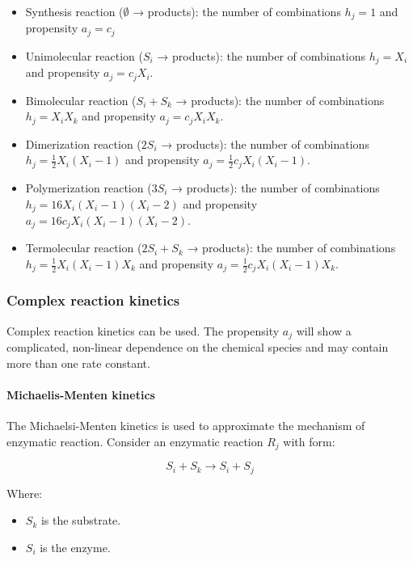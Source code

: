     \begin{itemize}
      \item Synthesis reaction ($\emptyset$ → products): the number of combinations $ h_j = 1 $ and propensity $ a_j =c_j $
      \item Unimolecular reaction ($ S_i$ → products): the number of combinations $h_j= X_i$ and propensity $ a_j = c_jX_i $.
      \item Bimolecular reaction ($ S_i + S_k$ → products): the number of combinations $ h_j = X_iX_k$ and propensity $ a_j = c_jX_iX_k $.
      \item Dimerization reaction ($2S_i$ → products): the number of combinations $ h_j = \frac{1}{2}X_i(X_i -1) $ and propensity $ a_j = \frac{1}{2}c_jX_i(X_i -1) $.
      \item Polymerization reaction ($3S_i$ → products): the number of combinations $ h_j = 16X_i(X_i -1)(X_i -2)$ and propensity $ a_j = 16c_jX_i(X_i -1)(X_i -2) $.
      \item Termolecular reaction ($2S_i + S_k$ → products): the number of combinations $ h_j = \frac{1}{2}X_i(X_i -1)X_k$ and propensity $ a_j = \frac{1}{2}c_jX_i(X_i -1)X_k $.
    \end{itemize}

    \subsubsection{Complex reaction kinetics}
    Complex reaction kinetics can be used.
    The propensity $a_j$ will show a complicated, non-linear dependence on the chemical species and may contain more than one rate constant.

      \paragraph{Michaelis-Menten kinetics}
      The Michaelsi-Menten kinetics is used to approximate the mechanism of enzymatic reaction.
      Consider an enzymatic reaction $R_j$ with form:

      $$S_i+S_k \rightarrow S_i + S_j$$

      Where:

      \begin{multicols}{2}
        \begin{itemize}
          \item $S_k$ is the substrate.
          \item $S_i$ is the enzyme.
        \end{itemize}
      \end{multicols}

